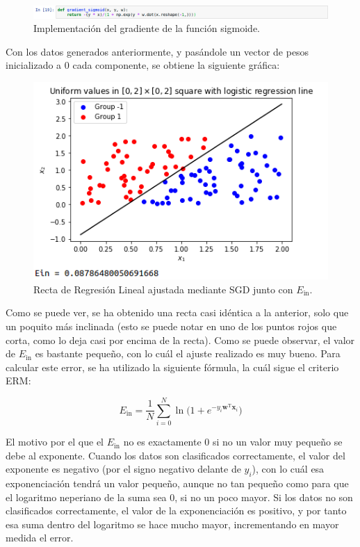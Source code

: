 \documentclass[11pt,a4paper]{article}
\newcommand{\ein}{$E_{\text{in}}$}
\begin{document}
\begin{figure}[H]
\centering
\includegraphics[scale=0.4]{img/gradient_sigmoid.png}
\caption{Implementación del gradiente de la función sigmoide.}
\end{figure}

Con los datos generados anteriormente, y pasándole un vector de pesos inicializado a 0 cada
componente, se obtiene la siguiente gráfica:

\begin{figure}[H]
\centering
\includegraphics[scale=0.6]{img/regression_2.png}
\caption{Recta de Regresión Lineal ajustada mediante SGD junto con \ein.}
\end{figure}

Como se puede ver, se ha obtenido una recta casi idéntica a la anterior, solo que un poquito más
inclinada (esto se puede notar en uno de los puntos rojos que corta, como lo deja casi por encima de
la recta). Como se puede observar, el valor de \ein{} es bastante pequeño, con lo cuál el ajuste
realizado es muy bueno.  Para calcular este error, se ha utilizado la siguiente fórmula, la cuál
sigue el criterio ERM:

\begin{equation}
	\label{eq:ein_erm}
	E_{\text{in}} = \frac{1}{N}
	\sum_{i = 0}^N \ln \Big( 1 + e^{-y_i\mathbf{w}^\text{T}\mathbf{x}_i}  \Big)
\end{equation}

El motivo por el que el \ein{} no es exactamente 0 si no un valor muy pequeño se debe al exponente.
Cuando los datos son clasificados correctamente, el valor del exponente es negativo (por el signo
negativo delante de $y_i$), con lo cuál esa exponenciación tendrá un valor pequeño, aunque no tan
pequeño como para que el logaritmo neperiano de la suma sea 0, si no un poco mayor. Si los datos
no son clasificados correctamente, el valor de la exponenciación es positivo, y por tanto esa
suma dentro del logaritmo se hace mucho mayor, incrementando en mayor medida el error.
\end{document}
